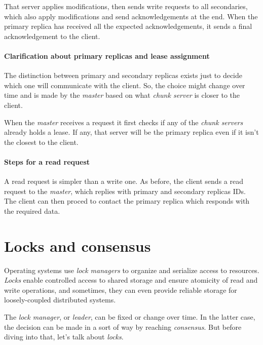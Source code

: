 That server applies modifications, then sends write requests to all secondaries,
which also apply modifications and send acknowledgements at the end. When the
primary replica has received all the expected acknowledgements, it sends a
final acknowledgement to the client.

\paragraph{Clarification about primary replicas and lease assignment}
The distinction between primary and secondary replicas exists just to decide
which one will communicate with the client. So, the choice might change over
time and is made by the \emph{master} based on what \emph{chunk server} is
closer to the client.

When the \emph{master} receives a request it first checks if any of the
\emph{chunk servers} already holds a lease. If any, that server will be the
primary replica even if it isn't the closest to the client.

\paragraph{Steps for a read request}
A read request is simpler than a write one. As before, the client sends a read
request to the \emph{master}, which replies with primary and secondary replicas
IDs. The client can then proced to contact the primary replica which responds
with the required data.

\section{Locks and consensus}
Operating systems use \emph{lock managers} to organize and serialize access to
resources. \emph{Locks} enable controlled access to shared storage and ensure
atomicity of read and write operations, and sometimes, they can even provide
reliable storage for loosely-coupled distributed systems.

The \emph{lock manager}, or \emph{leader}, can be fixed or change over time. In
the latter case, the decision can be made in a sort of  way by
reaching \emph{consensus}. But before diving into that, let's talk about
\emph{locks}.

